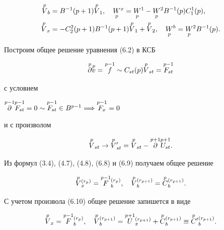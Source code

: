 \begin{align} 


\begin{split} 


\up{p}{V}_b&=B^{-1}(p+1)\up{p}{V}_1, \quad 


\down{p}{W}^x=\down{p}{W}^1-\down{p}{W}^2B^{-1}(p)C^1_1(p),\\ 


\up{p}{V}_x&=-C^2_2(p+1)B^{-1}(p+1)\up{p}{V}_1+\up{p}{V}_2,\quad 


\down{p}{W}^b=\down{p}{W}^2B^{-1}(p). 


\end{split} 


\end{align} 


 


Построим общее решение уравнения (6.2) в КСБ 


\begin{equation} 


\up{p}{\partial}\up{p}{v}=\up{p-1}{f}\sim 


C_{st}(p)\up{p}{V}_{st}=\up{p-1}{F_{st}} 


\end{equation} 


с условием 


$\up{p-1}{\partial}\up{p-1}{F_{st}}=0\sim 


\up{p-1}{F_{st}}\in B^{p-1}\Longrightarrow\up{p-1}{F_x}=0$ 


и с произволом 


\begin{equation} 


\up{p}{V}_{st}\to\up{p}{V}'_{st}=\up{p}{V}_{st}- 


\up{p+1}{\partial}\up{p+1}{U_{st}}. 


\end{equation} 


Из формул (3.4), (4.7), (4.8), (6.8) и (6.9) получаем общее решение 


$$ 


\up{p}{V}_x^{(r_p)}=\up{p-1}{F}{}_b^{(r_p)},\quad 


\up{p}{V}_b^{(r_{p+1})}=\up{p}{C}{}_b^{(r_{p+1})}. 


$$ 


С учетом произвола (6.10) общее решение запишется в виде


\begin{equation} 


\up{p}{V}_x=\up{p-1}{F}{}_b^{(r_p)},\quad 


\up{p}{V}{}_b^{(r_{p+1})}=\up{p+1}{U}{}_x^{(r_{p+1})}+ 


\up{p}{C}{}_b^{(r_{p+1})}\equiv \up{p}{C}'{}_b^{(r_{p+1})}. 


\end{equation} 


